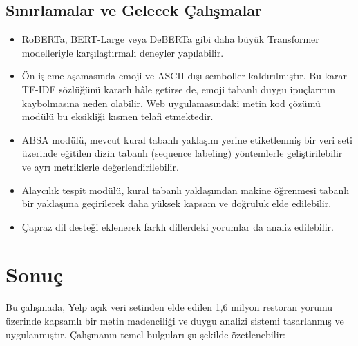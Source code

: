 \documentclass[conference]{IEEEtran}
\begin{document}
\subsection{Sınırlamalar ve Gelecek Çalışmalar}
\begin{itemize}
    \item RoBERTa, BERT-Large veya DeBERTa gibi daha büyük Transformer modelleriyle karşılaştırmalı deneyler yapılabilir.
    \item Ön işleme aşamasında emoji ve ASCII dışı semboller kaldırılmıştır. Bu karar TF-IDF sözlüğünü kararlı hâle getirse de, emoji tabanlı duygu ipuçlarının kaybolmasına neden olabilir. Web uygulamasındaki metin kod çözümü modülü bu eksikliği kısmen telafi etmektedir.
    \item ABSA modülü, mevcut kural tabanlı yaklaşım yerine etiketlenmiş bir veri seti üzerinde eğitilen dizin tabanlı (sequence labeling) yöntemlerle geliştirilebilir ve ayrı metriklerle değerlendirilebilir.
    \item Alaycılık tespit modülü, kural tabanlı yaklaşımdan makine öğrenmesi tabanlı bir yaklaşıma geçirilerek daha yüksek kapsam ve doğruluk elde edilebilir.
    \item Çapraz dil desteği eklenerek farklı dillerdeki yorumlar da analiz edilebilir.
\end{itemize}

\section{Sonuç}
\label{sec:sonuc}

Bu çalışmada, Yelp açık veri setinden elde edilen 1,6 milyon restoran yorumu üzerinde kapsamlı bir metin madenciliği ve duygu analizi sistemi tasarlanmış ve uygulanmıştır. Çalışmanın temel bulguları şu şekilde özetlenebilir:
\end{document}

